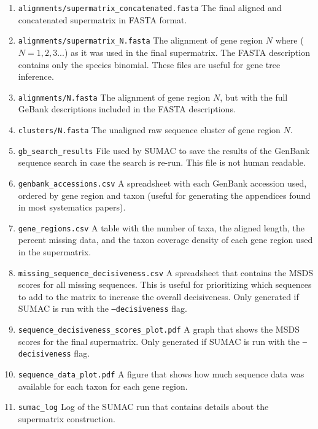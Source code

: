 \documentclass[10pt]{report}
\begin{document}
\begin{enumerate}

\item \texttt{alignments/supermatrix\_concatenated.fasta} The final aligned and concatenated supermatrix in FASTA format.

\item \texttt{alignments/supermatrix\_N.fasta} The alignment of gene region $N$ where ($N = 1,2,3...$) as it was used in the final supermatrix. The FASTA description contains only the species binomial. These files are useful for gene tree inference.

\item \texttt{alignments/N.fasta} The alignment of gene region $N$, but with the full GeBank descriptions included in the FASTA descriptions.

\item \texttt{clusters/N.fasta} The unaligned raw sequence cluster of gene region $N$.

\item \texttt{gb\_search\_results} File used by SUMAC to save the results of the GenBank sequence search in case the search is re-run. This file is not human readable.

\item \texttt{genbank\_accessions.csv} A spreadsheet with each GenBank accession used, ordered by gene region and taxon (useful for generating the appendices found in most systematics papers).

\item \texttt{gene\_regions.csv} A table with the number of taxa, the aligned length, the percent missing data, and the taxon coverage density of each gene region used in the supermatrix.

\item \texttt{missing\_sequence\_decisiveness.csv} A spreadsheet that contains the MSDS scores for all missing sequences. This is useful for prioritizing which sequences to add to the matrix to increase the overall decisiveness. Only generated if SUMAC is run with the \texttt{--decisiveness} flag.

\item \texttt{sequence\_decisiveness\_scores\_plot.pdf} A graph that shows the MSDS scores for the final supermatrix. Only generated if SUMAC is run with the \texttt{--decisiveness} flag.

\item \texttt{sequence\_data\_plot.pdf} A figure that shows how much sequence data was available for each taxon for each gene region.

\item \texttt{sumac\_log} Log of the SUMAC run that contains details about the supermatrix construction.

\end{enumerate}
\end{document}

